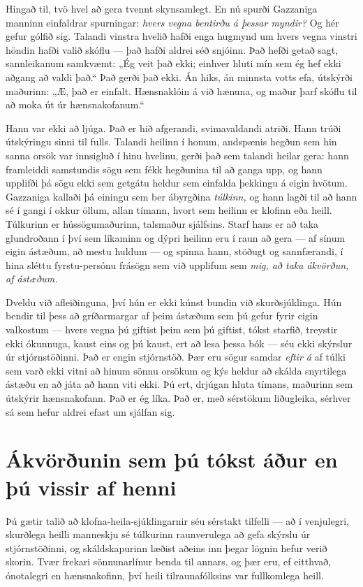 Hingað til, tvö hvel að gera tvennt skynsamlegt. En nú spurði Gazzaniga manninn einfaldrar spurningar: \emph{hvers vegna bentirðu á þessar myndir?} Og hér gefur gólfið sig. Talandi vinstra hvelið hafði enga hugmynd um hvers vegna vinstri höndin hafði valið skóflu — það hafði aldrei séð snjóinn. Það hefði getað sagt, sannleikanum samkvæmt: „Ég veit það ekki; einhver hluti mín sem ég hef ekki aðgang að valdi það.“ Það gerði það ekki. Án hiks, án minnsta votts efa, útskýrði maðurinn: „Æ, það er einfalt. Hænsnaklóin á við hænuna, og maður þarf skóflu til að moka út úr hænsnakofanum.“

Hann var ekki að ljúga. Það er hið afgerandi, svimavaldandi atriði. Hann trúði útskýringu sinni til fulls. Talandi heilinn í honum, andspænis hegðun sem hin sanna orsök var innsigluð í hinu hvelinu, gerði það sem talandi heilar gera: hann framleiddi samstundis sögu sem fékk hegðunina til að ganga upp, og hann upplifði þá sögu ekki sem getgátu heldur sem einfalda þekkingu á eigin hvötum. Gazzaniga kallaði þá einingu sem ber ábyrgðina \emph{túlkinn,} og hann lagði til að hann sé í gangi í okkur öllum, allan tímann, hvort sem heilinn er klofinn eða heill. Túlkurinn er hússögumaðurinn, talsmaður sjálfsins. Starf hans er að taka glundroðann í því sem líkaminn og dýpri heilinn eru í raun að gera — af sínum eigin ástæðum, að mestu huldum — og spinna hann, stöðugt og sannfærandi, í hina sléttu fyrstu-persónu frásögn sem við upplifum sem \emph{mig, að taka ákvörðun, af ástæðum.}

Dveldu við afleiðinguna, því hún er ekki kúnst bundin við skurðsjúklinga. Hún bendir til þess að gríðarmargar af þeim ástæðum sem þú gefur fyrir eigin valkostum — hvers vegna þú giftist þeim sem þú giftist, tókst starfið, treystir ekki ókunnuga, kaust eins og þú kaust, ert að lesa þessa bók — séu ekki skýrslur úr stjórnstöðinni. Það er engin stjórnstöð. Þær eru sögur samdar \emph{eftir á} af túlki sem varð ekki vitni að hinum sönnu orsökum og kýs heldur að skálda snyrtilega ástæðu en að játa að hann viti ekki. Þú ert, drjúgan hluta tímans, maðurinn sem útskýrir hænsnakofann. Það er ég líka. Það er, með sérstökum liðugleika, sérhver sá sem hefur aldrei efast um sjálfan sig.

\section*{Ákvörðunin sem þú tókst áður en þú vissir af henni}

Þú gætir talið að klofna-heila-sjúklingarnir séu sérstakt tilfelli — að í venjulegri, skurðlega heilli manneskju sé túlkurinn raunverulega að gefa skýrslu úr stjórnstöðinni, og skáldskapurinn læðist aðeins inn þegar lögnin hefur verið skorin. Tvær frekari sönnunarlínur benda til annars, og þær eru, ef eitthvað, ónotalegri en hænsnakofinn, því heili tilraunafólksins var fullkomlega heill.

